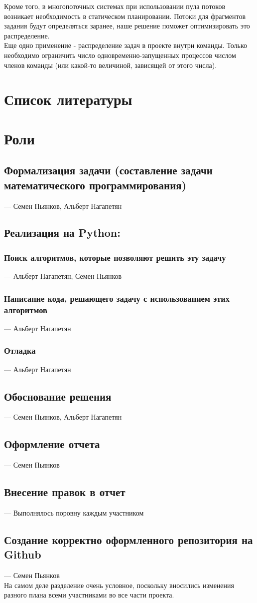 \documentclass{article}
\begin{document}
Кроме того, в многопоточных системах при использовании пула потоков возникает необходимость в статическом планировании. Потоки для фрагментов задания будут определяться заранее, наше решение поможет оптимизировать это распределение.\\

Еще одно применение - распределение задач в проекте внутри команды. Только необходимо ограничить число одновременно-запущенных процессов числом членов команды (или какой-то величиной, зависящей от этого числа).\\


\section{Список литературы}


\section{Роли}

\subsection{Формализация задачи (составление задачи математического программирования)} --- Семен Пьянков, Альберт Нагапетян
\subsection{Реализация на Python:}
    \subsubsection{Поиск алгоритмов, которые позволяют решить эту задачу} --- Альберт Нагапетян, Семен Пьянков
    \subsubsection{Написание кода, решающего задачу с использованием этих алгоритмов} --- Альберт Нагапетян
    \subsubsection{Отладка} --- Альберт Нагапетян %
\subsection{Обоснование решения} --- Семен Пьянков, Альберт Нагапетян
\subsection{Оформление отчета} --- Семен Пьянков
\subsection{Внесение правок в отчет} --- Выполнялось поровну каждым участником
\subsection{Создание корректно оформленного репозитория на Github} --- Семен Пьянков\\

На самом деле разделение очень условное, поскольку вносились изменения разного плана всеми участниками во все части проекта.\\
\end{document}
